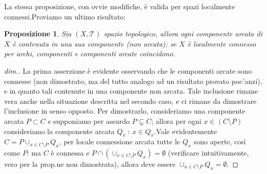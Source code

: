 \documentclass[10pt,a4paper]{article}
\theoremstyle{ilemma}
\theoremstyle{plain}
\theoremstyle{plain}
\newtheorem*{proposition}{Proposizione}
\theoremstyle{iother}
\theoremstyle{icorollary}
\theoremstyle{numcorollary}
\theoremstyle{plain}
\begin{document}
La stessa proposizione, con ovvie modifiche, \`e valida per spazi
localmente connessi.\newline Proviamo un ultimo risultato:
\begin{proposition}
  Sia $(X,\mathcal T)$ spazio topologico, allora ogni componente arcata di $X$
  \`e contenuta in una sua componente (non arcata); se $X$ \`e localmente
  connesso per archi, componenti e componenti arcate coincidono.
\end{proposition}
\begin{proof}[dim.]
  La prima asserzione \`e evidente osservando che le componenti arcate sono
  connesse (non dimostrato, ma del tutto analogo ad un risultato provato
  poc'anzi), e in quanto tali contenute in una componente non arcata.\newline
  Tale inclusione rimane vera anche nella situazione descritta nel secondo caso,
  e ci rimane da dimostrare l'inclusione in senso opposto. Per dimostrarlo,
  consideriamo una componente arcata $P\subset C$ e supponiamo per assurdo
  $P\subsetneq C$; allora per ogni $x\in (C\setminus P)$ consideriamo la
  componente arcata $Q_x\ :\ x\in Q_x$.\newline Vale evidentemente
  $C=P\cup_{x\in C\setminus P}Q_x$, per locale connessione arcata tutte le $Q_x$
  sono aperte, cos\`i come $P$: ma $C$ \`e connessa e $P\cap(\cup_{x\in
  C\setminus P}Q_x)=\emptyset$ (verificare intuitivamente, vero per la prop.ne
  non dimostrata), allora deve essere $\cup_{x\in C\setminus P}Q_x=\emptyset$.

\end{proof}
\end{document}
